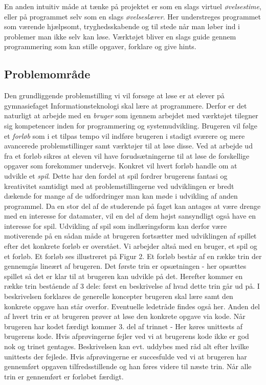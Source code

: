 \documentclass[10pt,a4paper,danish]{article}
\begin{document}
En anden intuitiv måde at tænke på projektet er som en slags virtuel \emph{øvelsestime}, eller på programmet selv som en slags \emph{øvelseslærer}. Her understreges programmet som værende hjælpsomt, tryghedsskabende og til stede når man løber ind i problemer man ikke selv kan løse. Værktøjet bliver en slags guide gennem programmering som kan stille opgaver, forklare og give hints.

\subsection{Problemområde}
Den grundliggende problemstilling vi vil forsøge at løse er at elever på gymnasiefaget Informationsteknologi skal lære at programmere. Derfor er det naturligt at arbejde med en \emph{bruger} som igennem arbejdet med værktøjet tilegner sig kompetencer inden for programmering og systemudvikling.
Brugeren vil følge et \emph{forløb} som i et tilpas tempo vil indføre brugeren i stadigt sværere og mere avancerede problemstillinger samt værktøjer til at løse disse.
\newline
\newline
Ved at arbejde ud fra et forløb sikres at eleven vil have forudsætningerne til at løse de forskellige opgaver som forekommer undervejs.
Konkret vil hvert forløb handle om at udvikle et \emph{spil}. Dette har den fordel at spil fordrer brugerens fantasi og kreativitet samtidigt med at problemstillingerne ved udviklingen er bredt dækende for mange af de udfordringer man kan møde i udvikling af anden programmel.
Da en stor del af de studerende på faget kan antages at være drenge med en interesse for datamater, vil en del af dem højst sansyndligt også have en interesse for spil. Udvikling af spil som indlæringsform kan derfor være motiverende på en sådan måde at brugeren fortsætter med udviklingen af spillet efter det konkrete forløb er overstået.
\newline
\newline
Vi arbejder altså med en bruger, et spil og et forløb. Et forløb ses illustreret på Figur 2. Et forløb består af en række trin der gennemgås lineært af brugeren. Det første trin er opsætningen - her opsættes spillet så det er klar til at brugeren kan udvikle på det. Herefter kommer en række trin bestående af 3 dele: først en beskrivelse af hvad dette trin går ud på. I beskrivelsen forklares de generelle koncepter brugeren skal lære samt den konkrete opgave han står overfor. Eventuelle ledetråde findes også her. Anden del af hvert trin er at brugeren prøver at løse den konkrete opgave via kode. Når brugeren har kodet færdigt kommer 3. del af trinnet - Her køres unittests af brugerens kode. Hvis afprøvingerne fejler ved vi at brugerens kode ikke er god nok og trinet gentages. Beskrivelsen kan evt. uddybes med råd alt efter hvilke unittests der fejlede. Hvis afprøvingerne er succesfulde ved vi at brugeren har gennemført opgaven tilfredsstillende og han føres videre til næste trin. Når alle trin er gennemført er forløbet færdigt.
\end{document}

